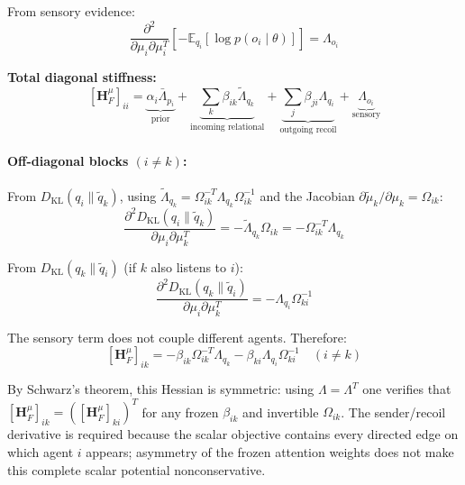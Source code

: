 \documentclass[12pt]{article}
\begin{document}
From sensory evidence:
\begin{equation}
\frac{\partial^2}{\partial \mu_i \partial \mu_i^T}\left[-\mathbb{E}_{q_i}[\log p(o_i \mid \theta)]\right] = \Lambda_{o_i}
\end{equation}

\textbf{Total diagonal stiffness:}
\begin{equation}
\boxed{
[\mathbf{H}_F^\mu]_{ii} = \underbrace{\alpha_i\bar{\Lambda}_{p_i}}_{\text{prior}} + \underbrace{\sum_k \beta_{ik}\tilde{\Lambda}_{q_k}}_{\text{incoming relational}} + \underbrace{\sum_j \beta_{ji}\Lambda_{q_i}}_{\text{outgoing recoil}} + \underbrace{\Lambda_{o_i}}_{\text{sensory}}
}
\label{eq:mass_diagonal}
\end{equation}

\paragraph{Off-diagonal blocks $(i \neq k)$:}

From $D_{\mathrm{KL}}(q_i \| \tilde{q}_k)$, using $\tilde{\Lambda}_{q_k} = \Omega_{ik}^{-T}\Lambda_{q_k}\Omega_{ik}^{-1}$ and the Jacobian $\partial\tilde{\mu}_k/\partial\mu_k = \Omega_{ik}$:
\begin{equation}
\frac{\partial^2 D_{\mathrm{KL}}(q_i \| \tilde{q}_k)}{\partial \mu_i \partial \mu_k^T} = -\tilde{\Lambda}_{q_k}\Omega_{ik} = -\Omega_{ik}^{-T}\Lambda_{q_k}
\end{equation}

From $D_{\mathrm{KL}}(q_k \| \tilde{q}_i)$ (if $k$ also listens to $i$):
\begin{equation}
\frac{\partial^2 D_{\mathrm{KL}}(q_k \| \tilde{q}_i)}{\partial \mu_i \partial \mu_k^T} = -\Lambda_{q_i}\Omega_{ki}^{-1}
\end{equation}

The sensory term does not couple different agents. Therefore:
\begin{equation}
\boxed{
[\mathbf{H}_F^\mu]_{ik} = -\beta_{ik}\Omega_{ik}^{-T}\Lambda_{q_k} - \beta_{ki}\Lambda_{q_i}\Omega_{ki}^{-1} \quad (i \neq k)
}
\label{eq:mass_offdiagonal}
\end{equation}


By Schwarz's theorem, this Hessian is symmetric: using $\Lambda=\Lambda^T$ one verifies that $[\mathbf H_F^\mu]_{ik}=([\mathbf H_F^\mu]_{ki})^T$ for any frozen $\beta_{ik}$ and invertible $\Omega_{ik}$. The sender/recoil derivative is required because the scalar objective contains every directed edge on which agent $i$ appears; asymmetry of the frozen attention weights does not make this complete scalar potential nonconservative.
\end{document}

